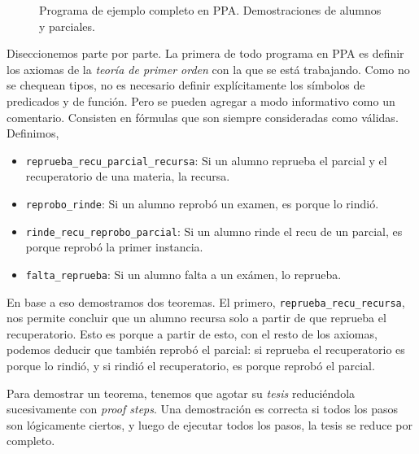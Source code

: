 \begin{figure}[H]
    
    \caption{Programa de ejemplo completo en PPA. Demostraciones de alumnos y parciales.}
    \label{ppa:prog:alumnos}
\end{figure}

Diseccionemos parte por parte. La primera de todo programa en PPA es definir los
axiomas de la \textit{teoría de primer orden} con la que se está trabajando.
Como no se chequean tipos, no es necesario definir explícitamente los símbolos
de predicados y de función. Pero se pueden agregar a modo informativo como un
comentario. Consisten en fórmulas que son siempre consideradas como válidas.
Definimos,
\begin{itemize}
    \item \lstinline{reprueba_recu_parcial_recursa}: Si un alumno reprueba el
    parcial y el recuperatorio de una materia, la recursa.
    \item \lstinline{reprobo_rinde}: Si un alumno reprobó un examen, es porque lo
    rindió.
    \item \lstinline{rinde_recu_reprobo_parcial}: Si un alumno rinde el recu de
    un parcial, es porque reprobó la primer instancia.
    \item \lstinline{falta_reprueba}: Si un alumno falta a un exámen, lo reprueba.
\end{itemize}



En base a eso demostramos dos teoremas. El primero,
\lstinline{reprueba_recu_recursa}, nos permite concluir que un alumno recursa
solo a partir de que reprueba el recuperatorio. Esto es porque a partir de esto,
con el resto de los axiomas, podemos deducir que también reprobó el parcial: si
reprueba el recuperatorio es porque lo rindió, y si rindió el recuperatorio, es
porque reprobó el parcial.

\begin{figure}[H]
    
\end{figure}

Para demostrar un teorema, tenemos que agotar su \textit{tesis} reduciéndola
sucesivamente con \textit{proof steps}. Una demostración es correcta si todos
los pasos son lógicamente ciertos, y luego de ejecutar todos los pasos, la tesis
se reduce por completo.

